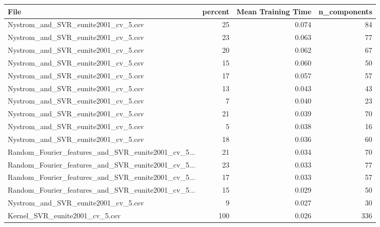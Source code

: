 \begin{tabularx}{\textwidth}{lrrr}
\toprule
                                              File &  percent &  Mean Training Time &  n\_components \\
\midrule
               Nystrom\_and\_SVR\_eunite2001\_cv\_5.csv &       25 &               0.074 &            84 \\
               Nystrom\_and\_SVR\_eunite2001\_cv\_5.csv &       23 &               0.063 &            77 \\
               Nystrom\_and\_SVR\_eunite2001\_cv\_5.csv &       20 &               0.062 &            67 \\
               Nystrom\_and\_SVR\_eunite2001\_cv\_5.csv &       15 &               0.060 &            50 \\
               Nystrom\_and\_SVR\_eunite2001\_cv\_5.csv &       17 &               0.057 &            57 \\
               Nystrom\_and\_SVR\_eunite2001\_cv\_5.csv &       13 &               0.043 &            43 \\
               Nystrom\_and\_SVR\_eunite2001\_cv\_5.csv &        7 &               0.040 &            23 \\
               Nystrom\_and\_SVR\_eunite2001\_cv\_5.csv &       21 &               0.039 &            70 \\
               Nystrom\_and\_SVR\_eunite2001\_cv\_5.csv &        5 &               0.038 &            16 \\
               Nystrom\_and\_SVR\_eunite2001\_cv\_5.csv &       18 &               0.036 &            60 \\
Random\_Fourier\_features\_and\_SVR\_eunite2001\_cv\_5... &       21 &               0.034 &            70 \\
Random\_Fourier\_features\_and\_SVR\_eunite2001\_cv\_5... &       23 &               0.033 &            77 \\
Random\_Fourier\_features\_and\_SVR\_eunite2001\_cv\_5... &       17 &               0.033 &            57 \\
Random\_Fourier\_features\_and\_SVR\_eunite2001\_cv\_5... &       15 &               0.029 &            50 \\
               Nystrom\_and\_SVR\_eunite2001\_cv\_5.csv &        9 &               0.027 &            30 \\
                    Kernel\_SVR\_eunite2001\_cv\_5.csv &      100 &               0.026 &           336 \\

\end{tabularx}
